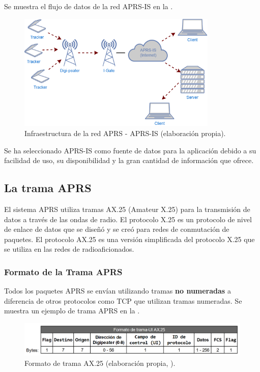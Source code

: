 Se muestra el flujo de datos de la red APRS-IS en la .

\begin{figure}[!h]
	\centering
	\includegraphics[width=0.85\textwidth]{Imagenes/Chapter_4/aprs_infra.png}
	\caption[Infraestructura de la red APRS - APRS-IS.]{Infraestructura de la red APRS - APRS-IS (elaboración propia).}
	\label{fig:aprs-infra}
\end{figure}

Se ha seleccionado APRS-IS como fuente de datos para la aplicación debido a su facilidad de uso, su disponibilidad y la gran cantidad de información que ofrece.

\subsection*{La trama APRS}
El sistema APRS utiliza tramas AX.25 (Amateur X.25) para la transmisión de datos a través de las ondas de radio. El protocolo X.25 es un protocolo de nivel de enlace de datos que se diseñó y se creó para redes de conmutación de paquetes. El protocolo AX.25 es una versión simplificada del protocolo X.25 que se utiliza en las redes de radioaficionados.

\subsubsection*{Formato de la Trama APRS}

Todos los paquetes APRS se envían utilizando tramas \textbf{no numeradas} a diferencia de otros protocolos como TCP que utilizan tramas numeradas. Se muestra un ejemplo de trama APRS en la .

\begin{figure}[h]
	\centering
	\includegraphics[width=1\textwidth]{Imagenes/Chapter_4/AX.25Frame.png}
	\caption[Formato de trama AX.25.]{Formato de trama AX.25 (elaboración propia, \cite{APRSProtocol}).}
	\label{fig:aprs-frame}
\end{figure}

